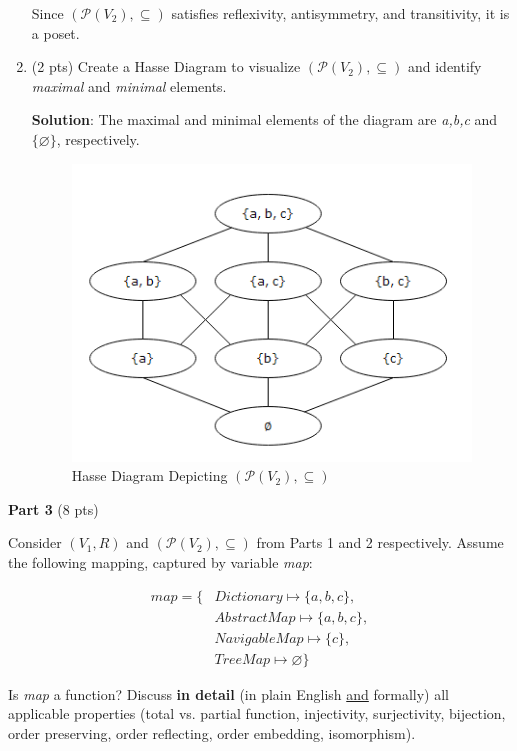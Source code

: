 \documentclass[12pt]{article}
\begin{document}
\begin{spacing}{1.5}
\begin{enumerate}
		      Since \( (\mathcal{P}(V_2),\subseteq) \) satisfies reflexivity, antisymmetry, and transitivity, it is a poset.
		      		              
		\item (2 pts) Create a Hasse Diagram to visualize $(\mathcal{P}(V_2),\subseteq)$ and identify \textit{maximal} and \textit{minimal} elements.

            \textbf{Solution}: The maximal and minimal elements of the diagram are \textit{a,b,c} and $\{\varnothing\}$, respectively.
            
		      \begin{figure}[htp]
		      	\centering
		      	\includegraphics{HasseDiagram_6_2_3.png}
		      	\caption{Hasse Diagram Depicting $(\mathcal{P}(V_2),\subseteq)$}
		      	\label{fig:figure}
		      \end{figure}
		      		        
	\end{enumerate}
			    
	\noindent \textbf{Part 3} (8 pts)
			
	\noindent Consider $(V_1, R)$ and $(\mathcal{P}(V_2), \subseteq)$ from Parts 1 and 2 respectively. Assume the following mapping, captured by variable \textit{map}:
			
	\begin{align*}
		map = \{ & Dictionary \mapsto \{a,b,c\},  \\
		         & AbstractMap \mapsto \{a,b,c\}, \\
		         & NavigableMap \mapsto \{c\},    \\
		         & TreeMap \mapsto \varnothing\}  
	\end{align*}
			
	\noindent Is \textit{map} a function? Discuss \textbf{in detail} (in plain English \uline{and} formally) all applicable properties (total vs. partial function, injectivity, surjectivity, bijection, order preserving, order reflecting, order embedding, isomorphism).\\
		

\end{spacing}
\end{document}
